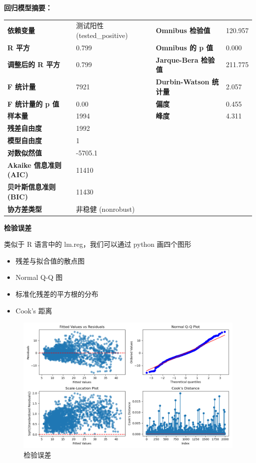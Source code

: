\documentclass[UTF8,ctexart,a4paper,11pt,openany]{article}
\theoremstyle{definition}
\begin{document}
    \textbf{回归模型摘要：}\par
    \begin{tabular}{|llll|}
        \hline
        \textbf{依赖变量} & 测试阳性 (tested\_positive) & \textbf{Omnibus 检验值} & 120.957 \\
        \textbf{R 平方} & 0.799 & \textbf{Omnibus 的 p 值} & 0.000 \\
        \textbf{调整后的 R 平方} & 0.799 & \textbf{Jarque-Bera 检验值} & 211.775 \\
        \textbf{F 统计量} & 7921 & \textbf{Durbin-Watson 统计量} & 2.057 \\
        \textbf{F 统计量的 p 值} & 0.00 & \textbf{偏度} & 0.455 \\
        \textbf{样本量} & 1994 & \textbf{峰度} & 4.311 \\
        \textbf{残差自由度} & 1992 & & \\
        \textbf{模型自由度} & 1 & & \\
        \textbf{对数似然值} & -5705.1 & & \\
        \textbf{Akaike 信息准则 (AIC)} & 11410 & & \\
        \textbf{贝叶斯信息准则 (BIC)} & 11430 & & \\
        \textbf{协方差类型} & 非稳健 (nonrobust) & & \\
        \hline
        \end{tabular}
    \par
    \noindent \textbf{检验误差}\par
    类似于 R 语言中的 lm.reg，我们可以通过 python 画四个图形
    \begin{itemize}
        \item 残差与拟合值的散点图
        \item Normal Q-Q 图
        \item 标准化残差的平方根的分布
        \item Cook's 距离
    \end{itemize}
    \begin{figure}[H]
        \centering
        \includegraphics[width=1\textwidth]{Figure_7.png}
        \caption{检验误差}
        \label{fig:residual}
    \end{figure}
\end{document}
